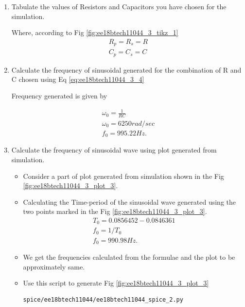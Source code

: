 \begin{enumerate}[label=\arabic*.,ref=\theenumi]
\item Tabulate the values of Resistors and Capacitors you have chosen for the simulation.

\solution

\begin{table}[!ht]
\centering

\caption{}
\label{table:ee18btech11044_t_1}
\end{table}

Where, according to Fig \ref{fig:ee18btech11044_3_tikz_1}
\begin{align}
    R_p = R_s = R \\
    C_p = C_s = C
\end{align}
 
 \item Calculate the frequency of sinusoidal generated for the combination of R and C chosen using Eq \ref{eq:ee18btech11044_3_4}
 
 \solution
 
 Frequency generated is given by 
 
 \begin{align}
     \omega_{0} = \frac{1}{ R C} \\
     \omega_{0} = 6250 rad/sec \\
     f_{0} = 995.22Hz.
 \end{align}
 
 \item Calculate the frequency of sinusoidal wave using plot generated from simulation.
 
 \solution
 \begin{itemize}
     \item Consider a part of plot generated from simulation shown in the Fig \ref{fig:ee18btech11044_3_plot_3}.
     \item Calculating the Time-period of the sinusoidal wave generated using the two points marked in the Fig \ref{fig:ee18btech11044_3_plot_3}.
     \begin{align}
         T_0 = 0.0856452 - 0.0846361 \\
         f_0 = 1/T_0 \\
         f_0 = 990.98Hz.
     \end{align}
     \item We get the frequencies calculated from the formulae and the plot to be approximately same.
     \item Use this script to generate Fig \ref{fig:ee18btech11044_3_plot_3}
\begin{lstlisting}
spice/ee18btech11044/ee18btech11044_spice_2.py
\end{lstlisting}
 \end{itemize}
 


\end{enumerate}
